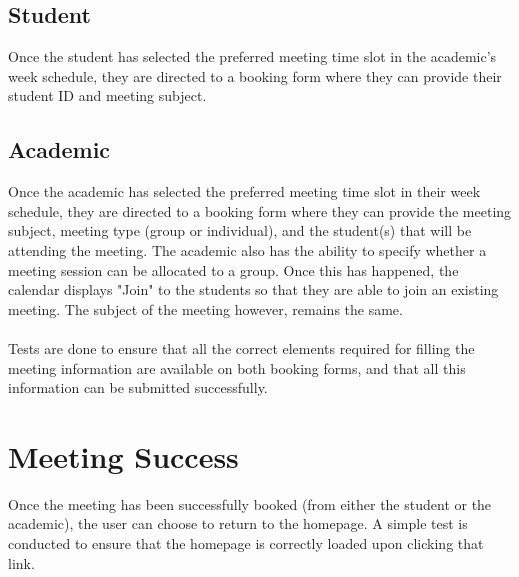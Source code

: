\documentclass[11pt, a4paper]{article}
\begin{document}
\subsection{Student}
Once the student has selected the preferred meeting time slot in the academic's week schedule, they are directed to a booking form where they can provide their student ID and meeting subject. 
\subsection{Academic}
Once the academic has selected the preferred meeting time slot in their week schedule, they are directed to a booking form where they can provide the meeting subject, meeting type (group or individual), and the student(s) that will be attending the meeting. The academic also has the ability to specify whether a meeting session can be allocated to a group. Once this has happened, the calendar displays "Join" to the students so that they are able to join an existing meeting. The subject of the meeting however, remains the same.
\\\\
Tests are done to ensure that all the correct elements required for filling the meeting information are available on both booking forms, and that all this information can be submitted successfully.

\section{Meeting Success}
Once the meeting has been successfully booked (from either the student or the academic), the user can choose to return to the homepage. A simple test is conducted to ensure that the homepage is correctly loaded upon clicking that link. 
\newpage
\end{document}
